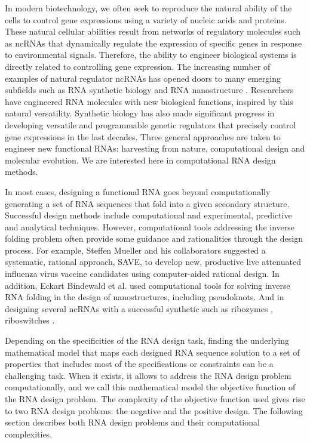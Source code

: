In modern biotechnology, we often seek to reproduce the natural ability of the cells to control gene expressions using a variety of nucleic acids and proteins. These natural cellular abilities result from networks of regulatory molecules such as \acp{ncRNA} that dynamically regulate the expression of specific genes in response to environmental signals. Therefore, the ability to engineer biological systems is directly related to controlling gene expression. The increasing number of examples of natural regulator \acp{ncRNA} has opened doors to many emerging subfields such as \ac{RNA} synthetic biology \cite{chappell2015renaissance, isaacs2006rna} and \ac{RNA} nanostructure \cite{jaeger2001tectorna, guo2010emerging}. Researchers have engineered \ac{RNA} molecules with new biological functions, inspired by this natural versatility. Synthetic biology has also made significant progress in developing versatile and programmable genetic regulators that precisely control gene expressions in the last decades. Three general approaches are taken to engineer new functional \acp{RNA}: harvesting from nature, computational design and molecular evolution. We are interested here in computational \ac{RNA} design methods.

In most cases, designing a functional \ac{RNA} goes beyond computationally generating a set of \ac{RNA} sequences that fold into a given secondary structure. Successful design methods include computational and experimental, predictive and analytical techniques. However, computational tools addressing the inverse folding problem often provide some guidance and rationalities through the design process. For example, Steffen Mueller and his collaborators \cite{mueller2010live} suggested a systematic, rational approach, \ac{SAVE}, to develop new, productive live attenuated influenza virus vaccine candidates using computer-aided rational design. In addition, Eckart Bindewald et al. \cite{bindewald2011multistrand} used computational tools for solving inverse \ac{RNA} folding in the design of nanostructures, including pseudoknots. And in designing several \acp{ncRNA} with a successful synthetic such as ribozymes \cite{dotu2014complete}, riboswitches \cite{findeiss2015design,wachsmuth2015design}. 

Depending on the specificities of the \ac{RNA} design task, finding the underlying mathematical model that maps each designed \ac{RNA} sequence solution to a set of properties that includes most of the specifications or constraints can be a challenging task. When it exists, it allows to address the \ac{RNA} design problem computationally, and we call this mathematical model the objective function of the \ac{RNA} design problem. The complexity of the objective function used gives rise to two \ac{RNA} design problems: the negative and the positive design. The following section describes both \ac{RNA} design problems and their computational complexities.

